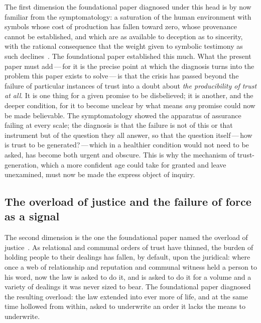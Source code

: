 The first dimension the foundational paper diagnosed under this head is by now familiar from the symptomatology: a saturation of the human environment with symbols whose cost of production has fallen toward zero, whose provenance cannot be established, and which are as available to deception as to sincerity, with the rational consequence that the weight given to symbolic testimony as such declines~\parencite{wanhong_grb}. The foundational paper established this much. What the present paper must add\,---\,for it is the precise point at which the diagnosis turns into the problem this paper exists to solve\,---\,is that the crisis has passed beyond the failure of particular instances of trust into a doubt about \emph{the producibility of trust at all}. It is one thing for a given promise to be disbelieved; it is another, and the deeper condition, for it to become unclear by what means \emph{any} promise could now be made believable. The symptomatology showed the apparatus of assurance failing at every scale; the diagnosis is that the failure is not of this or that instrument but of the question they all answer, so that the question itself\,---\,how is trust to be generated?\,---\,which in a healthier condition would not need to be asked, has become both urgent and obscure. This is why the mechanism of trust-generation, which a more confident age could take for granted and leave unexamined, must now be made the express object of inquiry.

\subsection{The overload of justice and the failure of force as a signal}
\label{p13:sub:diag-justice}

The second dimension is the one the foundational paper named the overload of justice~\parencite{wanhong_grb}. As relational and communal orders of trust have thinned, the burden of holding people to their dealings has fallen, by default, upon the juridical: where once a web of relationship and reputation and communal witness held a person to his word, now the law is asked to do it, and is asked to do it for a volume and a variety of dealings it was never sized to bear. The foundational paper diagnosed the resulting overload: the law extended into ever more of life, and at the same time hollowed from within, asked to underwrite an order it lacks the means to underwrite.

